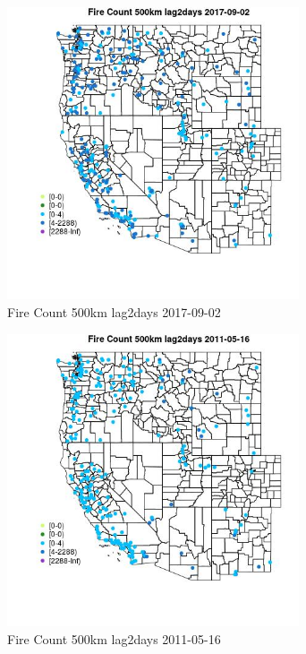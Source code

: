 \begin{figure} 
\centering  
\includegraphics[width=0.77\textwidth]{Code_Outputs/Report_ML_input_PM25_Step4_part_e_de_duplicated_aves_compiled_2019-05-20wNAs_MapObsFire_Count_500km_lag2days2017-09-02.jpg} 
\caption{\label{fig:Report_ML_input_PM25_Step4_part_e_de_duplicated_aves_compiled_2019-05-20wNAsMapObsFire_Count_500km_lag2days2017-09-02}Fire Count 500km lag2days 2017-09-02} 
\end{figure} 
 

\begin{figure} 
\centering  
\includegraphics[width=0.77\textwidth]{Code_Outputs/Report_ML_input_PM25_Step4_part_e_de_duplicated_aves_compiled_2019-05-20wNAs_MapObsFire_Count_500km_lag2days2011-05-16.jpg} 
\caption{\label{fig:Report_ML_input_PM25_Step4_part_e_de_duplicated_aves_compiled_2019-05-20wNAsMapObsFire_Count_500km_lag2days2011-05-16}Fire Count 500km lag2days 2011-05-16} 
\end{figure} 
 

